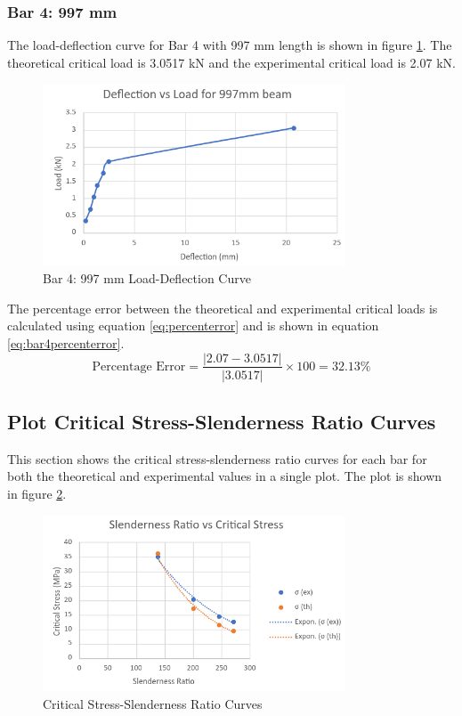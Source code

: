 \documentclass[12pt, titlepage]{article}
\begin{document}
\subsubsection{Bar 4: 997 mm}
The load-deflection curve for Bar 4 with 997 mm length is shown in figure
\ref{fig:bar4loaddefl}. The theoretical critical load is 3.0517 kN and the
experimental critical load is 2.07 kN.
\begin{figure}[H]
    \centering
    \includegraphics[width=0.8\textwidth]{./Images/d997.png}
    \caption{Bar 4: 997 mm Load-Deflection Curve}
    \label{fig:bar4loaddefl}
\end{figure}
The percentage error between the theoretical and experimental critical loads
is calculated using equation \ref{eq:percenterror} and is shown in equation
\ref{eq:bar4percenterror}.
\begin{equation}
    \label{eq:bar4percenterror}
    \text{Percentage Error} = \frac{\left| 2.07 - 3.0517\right|}{\left|3.0517\right|} \times 100 = 32.13\%
\end{equation}
\newpage
\subsection{Plot Critical Stress-Slenderness Ratio Curves}
This section shows the critical stress-slenderness ratio curves for each bar
for both the theoretical and experimental values in a single plot. The plot
is shown in figure \ref{fig:stressslenderness}.
\begin{figure}[H]
    \centering
    \includegraphics[width=0.8\textwidth]{./Images/s4.png}
    \caption{Critical Stress-Slenderness Ratio Curves}
    \label{fig:stressslenderness}
\end{figure}
\end{document}
